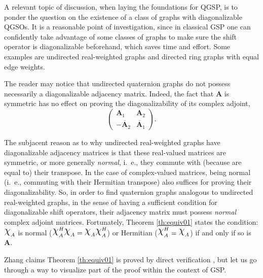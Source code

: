 A relevant topic of discussion, when laying the foundations for QGSP, is to ponder the question on the existence of a class of graphs with diagonalizable QGSOs. It is a reasonable point of investigation, since in classical GSP one can confidently take advantage of some classes of graphs to make sure the shift operator is diagonalizable beforehand, which saves time and effort. Some examples are undirected real-weighted graphs and directed ring graphs with equal edge weights.

The reader may notice that undirected quaternion graphs do not possess necessarily a diagonalizable adjacency matrix. Indeed, the fact that $\mathbf{A}$ is symmetric has no effect on proving the diagonalizability of its complex adjoint,
\begin{equation}
    \begin{pmatrix}
        \mathbf{A}_1              & \mathbf{A}_2            \\
        - \overline{\mathbf{A}}_2 & \overline{\mathbf{A}}_1
    \end{pmatrix}.
\end{equation}

The subjacent reason as to why undirected real-weighted graphs have diagonalizable adjacency matrices is that these real-valued matrices are symmetric, or more generally \textit{normal}, i.~e., they commute with (because are equal to) their transpose. In the case of complex-valued matrices, being normal (i.~e., commuting with their Hermitian transpose) also suffices for proving their diagonalizability. So, in order to find quaternion graphs analogous to undirected real-weighted graphs, in the sense of having a sufficient condition for diagonalizable shift operators, their adjacency matrix must possess \textit{normal} complex adjoint matrices. Fortunately, Theorem \ref{th:equiv01} states the condition:
$ \rchi_{A}$ is normal ($ \rchi_{A}^H \rchi_{A} = \rchi_{A} \rchi_{A}^H $) or Hermitian ($\rchi_{A}^H = \rchi_{A}$) if and only if so is $ \mathbf{A}$.

Zhang claims Theorem \ref{th:equiv01} is proved by direct verification \parencite{zhang1997quaternions}, but let us go through a way to visualize part of the proof within the context of GSP.

